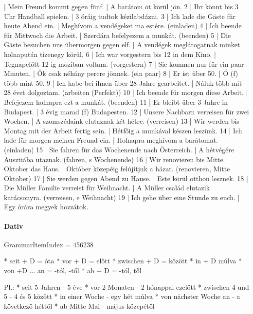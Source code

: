 \documentclass{article}
\newenvironment{desc}{\verbatim}{\endverbatim}
\newenvironment{exmp}{\verbatim}{\endverbatim}
\begin{document}
\begin{exmp}
1 | Mein Freund kommt gegen fünf. | A barátom öt körül jön.
2 | Ihr könnt bis 3 Uhr Handball spielen. | 3 óráig tudtok kézilabdázni.
3 | Ich lade die Gäste für heute Abend ein. | Meghívom a vendégeket ma estére. (einladen)
4 | Ich beende für Mittwoch die Arbeit. | Szerdára befelyezem a munkát. (beenden)
5 | Die Gäste besuchen uns übermorgen gegen elf. | A vendégek meglátogatnak minket holnapután tizenegy körül.
6 | Ich war vorgestern bis 12 in dem Kino. | Tegnapelőtt 12-ig moziban voltam. (vorgestern)
7 | Sie kommen nur für ein paar Minuten. | Ők csak néhány percre jönnek. (ein paar) 
8 | Er ist über 50. | Ő (f) több mint 50.
9 | Ich habe bei ihnen über 28 Jahre gearbeitet. | Náluk több mit 28 évet dolgoztam. (arbeiten (Perfekt))
10 | Ich beende für morgen diese Arbeit. | Befejezem holnapra ezt a munkát. (beenden)
11 | Er bleibt über 3 Jahre in Budapest. | 3 évig marad (f) Budapesten.
12 | Unsere Nachbarn verreisen für zwei Wochen. | A szomszédaink elutaznak két hétre. (verreisen)
13 | Wir werden bis Montag mit der Arbeit fertig sein. | Hétfőig a munkával készen leszünk.
14 | Ich lade für morgen meinen Freund ein. | Holnapra meghívom a barátomat. (einladen)
15 | Sie fahren für das Wochenende nach Österreich. | A hétvégére Ausztiába utaznak. (fahren, s Wochenende)
16 | Wir renovieren bis Mitte Oktober das Haus. | Október közepéig felújítjuk a házat. (renovieren, Mitte Oktober)
17 | Sie werden gegen Abend zu Hause. | Este körül otthon lesznek.
18 | Die Müller Familie verreist für Weihnacht. | A Müller család elutazik karácsonyra. (verreisen, e Weihnacht)
19 | Ich gehe über eine Stunde zu euch. | Egy órára megyek hozzátok.
\end{exmp}

\paragraph{Dativ}

GrammarItemIndex = 456238

\begin{desc}
* seit + D = óta
* vor  + D = előtt
* zwischen + D = között
* in + D múlva
* von +D ... an = -tól, -től
* ab + D = -tól, től

Pl.: * seit 5 Jahren - 5 éve
* vor 2 Monaten - 2 hónappal ezelőtt
* zwischen 4 und 5 - 4 és 5 között
* in einer Woche - egy hét múlva
* von nächster Woche an - a következő héttől
* ab Mitte Mai - május közepétől
\end{desc}
\end{document}
